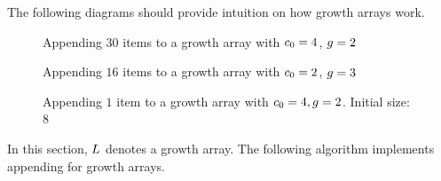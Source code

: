 \HdrGrowthArrayImpl

The following diagrams should provide intuition on how growth arrays work.

\begin{figure}[H]
\label{fig:1}
	\caption{Appending $30$ items to a growth array with $c_0 = 4$, $g = 2$}
\end{figure}

\begin{figure}[H]
\label{fig:2}
	\caption{Appending $16$ items to a growth array with $c_0 = 2$, $g = 3$}
\end{figure}

\begin{figure}[H]
\label{fig:3}
	\caption{Appending $1$ item to a growth array with $c_0 = 4, g = 2$. Initial size: $8$}
\end{figure}

In this section, $L$ denotes a growth array. The following algorithm implements appending for growth arrays.

